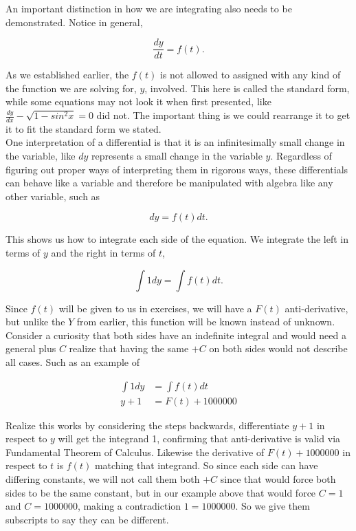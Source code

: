 \documentclass[12pt]{article}
\begin{document}
An important distinction in how we are integrating also needs to be demonstrated. Notice in general,

\begin{equation*}
    \frac{dy}{dt} = f(t).
\end{equation*}

As we established earlier, the $f(t)$ is not allowed to assigned with any kind of the function we are solving for, $y$, involved. This here is called the standard form, while some equations may not look it when first presented, like $\frac{dy}{dx} - \sqrt{1-sin^2{x}} = 0$ did not. The important thing is we could rearrange it to get it to fit the standard form we stated. \\

One interpretation of a differential is that it is an infinitesimally small change in the variable, like $dy$ represents a small change in the variable $y$. Regardless of figuring out proper ways of interpreting them in rigorous ways, these differentials can behave like a variable and therefore be manipulated with algebra like any other variable, such as

\begin{equation*}
    dy = f(t)dt.
\end{equation*}

This shows us how to integrate each side of the equation. We integrate the left in terms of $y$ and the right in terms of $t$,

\begin{equation*}
    \int 1 dy = \int f(t)dt.
\end{equation*}

Since $f(t)$ will be given to us in exercises, we will have a $F(t)$ anti-derivative, but unlike the $Y$ from earlier, this function will be known instead of unknown. \\

Consider a curiosity that both sides have an indefinite integral and would need a general plus $C$ realize that having the same $+C$ on both sides would not describe all cases. Such as an example of 

\begin{align*}
    \int 1 dy &= \int f(t)dt \\
    y+1 &= F(t)+1000000
\end{align*}

Realize this works by considering the steps backwards, differentiate $y+1$ in respect to $y$ will get the integrand 1, confirming that anti-derivative is valid via Fundamental Theorem of Calculus. Likewise the derivative of $F(t)+1000000$ in respect to $t$ is $f(t)$ matching that integrand. So since each side can have differing constants, we will not call them both $+C$ since that would force both sides to be the same constant, but in our example above that would force $C=1$ and $C=1000000$, making a contradiction $1=1000000$. So we give them subscripts to say they can be different.
\end{document}
